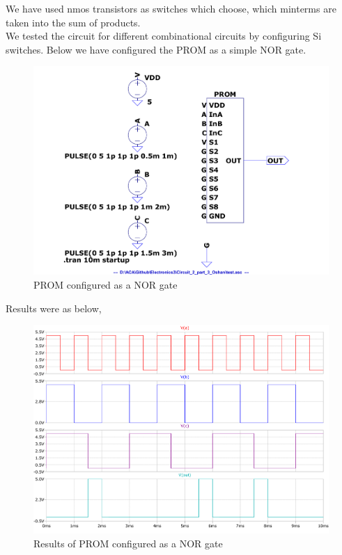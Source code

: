 \documentclass[a4paper,11pt]{article}%
\begin{document}
We have used nmos transistors as switches which choose, which minterms are taken into the sum of products.\\ 

We tested the circuit for different combinational circuits by configuring Si switches. Below we have configured the PROM as a simple NOR gate.\\


\begin{figure}[H]
	\centering
	\includegraphics[scale=0.4]{figures/Figure335.pdf}
	\caption{PROM configured as a NOR gate}
\end{figure}

Results were as below,
\begin{figure}[H]
	\centering
	\includegraphics[scale=0.5]{figures/Figure336.pdf}
	\caption{Results of PROM configured as a NOR gate}
\end{figure}
\end{document}
